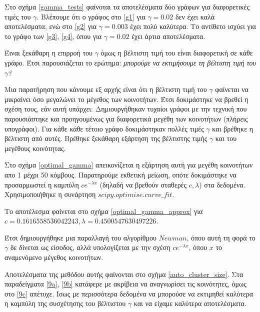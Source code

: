 \documentclass[10pt, letterpaper]{article}
\begin{document}
Στο σχήμα \ref{gamma_tests} φαίνοται τα αποτελέσματα δύο γράφων για διαφορετικές τιμές
του $\gamma$. Βλέπουμε ότι ο γράφος στο \ref{g1} για $\gamma = 0.02$ δεν έχει καλά 
αποτελέσματα, ενώ στο \ref{g2} για $\gamma = 0.003$ έχει πολύ καλύτερα. Το αντίθετο 
ισχύει για το γράφο των \ref{g3}, \ref{g4}, όπου για $\gamma = 0.02$ έχει άρτια αποτελέσματα.

Έιναι ξεκάθαρη η επιρροή του $\gamma$ όμως η βέλτιστη τιμή του είναι διαφορετική 
σε κάθε γράφο. Έτσι παρουσιάζεται το ερώτημα: \emph{μπορούμε να εκτιμήσουμε τη 
βέλτιστη τιμή του $\gamma$?}





Μια παρατήρηση που κάνουμε εξ αρχής είναι ότι η βέλτιστη τιμή του $\gamma$ φαίνεται 
να μικραίνει όσο μεγαλώνει το μέγεθος των κοινοτήτων. Έτσι δοκιμάστηκε να βρεθεί 
η σχέση τους, εάν αυτή υπάρχει: 
Δημιουργήθηκαν τυχαίοι γράφοι με την τεχνική που παρουσιάστηκε και προηγουμένως 
για διαφορετικά μεγέθη των κοινοτήτων (πλήρεις υπογράφοι). Για κάθε κάθε τέτοιο 
γράφο δοκιμάστηκαν πολλές τιμές $\gamma$ και βρέθηκε η βέλτιστη από αυτές. 
Βρέθηκε ξεκάθαρη εξάρτηση της βέλτιστης τιμής $\gamma$ και του μεγέθους κοινότητας.




Στο σχήμα \ref{optimal_gamma} απεικονίζεται η εξάρτηση αυτή για μεγέθη κοινοτήτων 
απο 1 μέχρι 50 κόμβους. Παρατηρούμε εκθετική μείωση, οπότε δοκιμάστηκε να προσαρμωστεί 
η καμπύλη $c e^{- \lambda x}$ (δηλαδή να βρεθούν σταθερές $c, \lambda$) στα δεδομένα.
Χρησιμοποιήθηκε η συνάρτηση $scipy.optimise.curve\_fit$.

Το αποτέλεσμα φαίνεται στο σχήμα \ref{optimal_gamma_approx} για $c = 0.1616558536042243, \lambda = 0.4500547630497226$.


Έτσι δημιουργήθηκε μια παραλλαγή του αλγορίθμου $Newman$, όπου αυτή τη φορά 
το $\gamma$ δε δίνεται ως είσοδος, αλλά υπολογίζεται με την σχέση $ce^{-\lambda x}$,
όπου $x$ το αναμενόμενο μέγεθος κοινοτήτων.

Αποτελέσματα της μεθόδου αυτής φαίνονται στο σχήμα \ref{auto_cluster_size}.
Στα παραδείγματα \ref{9a}, \ref{9b} κατάφερε με ακρίβεια να αναγνωρίσει 
τις κοινότητες, όμως στο \ref{9c} απέτυχε. Ίσως με περισσότερα δεδομένα 
να μπορούσε να εκτιμηθεί καλύτερα η καμπύλη της συσχέτησης του βέλτιστου $\gamma$
και να είχαμε καλύτερα αποτελέσματα. 
\end{document}
